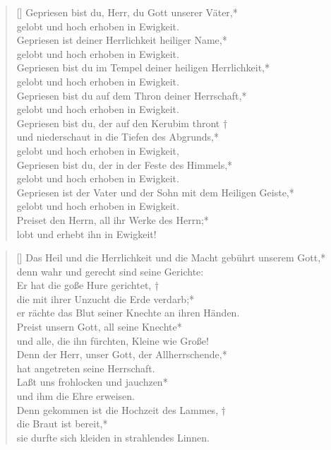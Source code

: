 \begin{verse}[\versewidth]
 Gepriesen bist du, Herr, du Gott unserer Väter,*\\
gelobt und hoch erhoben in Ewigkeit.\\
\vin Gepriesen ist deiner Herrlichkeit heiliger Name,*\\
\vin gelobt und hoch erhoben in Ewigkeit.\\
Gepriesen bist du im Tempel deiner heiligen Herrlichkeit,*\\
gelobt und hoch erhoben in Ewigkeit.\\
\vin Gepriesen bist du auf dem Thron deiner Herrschaft,*\\
\vin gelobt und hoch erhoben in Ewigkeit.\\
Gepriesen bist du, der auf den Kerubim thront †\\
und niederschaut in die Tiefen des Abgrunds,*\\
gelobt und hoch erhoben in Ewigkeit,\\
\vin Gepriesen bist du, der in der Feste des Himmels,*\\
\vin gelobt und hoch erhoben in Ewigkeit.\\
Gepriesen ist der Vater und der Sohn mit dem Heiligen Geiste,*\\
gelobt und hoch erhoben in Ewigkeit.\\

 \vin Preiset den Herrn, all ihr Werke des Herrn;*\\
 \vin lobt und erhebt ihn in Ewigkeit!\\

\end{verse}

\vspace{0.6cm}

\begin{verse}[\versewidth]
 Das Heil und die Herrlichkeit und die Macht
gebührt unserem Gott,*\\
denn wahr und gerecht sind seine Gerichte:\\
\vin Er hat die goße Hure gerichtet, †\\
\vin die mit ihrer Unzucht die Erde verdarb;*\\
\vin er rächte das Blut seiner Knechte an ihren Händen.\\
Preist unsern Gott, all seine Knechte*\\
und alle, die ihn fürchten, Kleine wie Große!\\
\vin Denn der Herr, unser Gott, der Allherrschende,*\\
\vin hat angetreten seine Herrschaft.\\
Laßt uns frohlocken und jauchzen*\\
und ihm die Ehre erweisen.\\
\vin Denn gekommen ist die Hochzeit des Lammes, †\\
\vin die Braut ist bereit,*\\
\vin sie durfte sich kleiden in strahlendes Linnen.\\
\end{verse}


